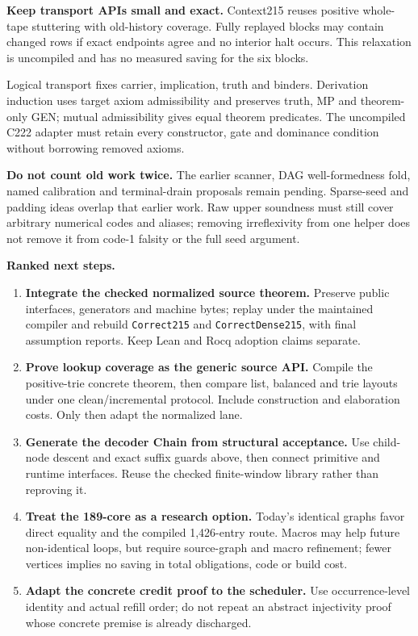 \documentclass[11pt]{article}
\newcommand{\code}[1]{\texttt{#1}}
\begin{document}
\textbf{Keep transport APIs small and exact.} Context215 reuses positive whole-tape stuttering with old-history coverage. Fully replayed blocks may contain changed rows if exact endpoints agree and no interior halt occurs. This relaxation is uncompiled and has no measured saving for the six blocks.

Logical transport fixes carrier, implication, truth and binders. Derivation induction uses target axiom admissibility and preserves truth, MP and theorem-only GEN; mutual admissibility gives equal theorem predicates. The uncompiled C222 adapter must retain every constructor, gate and dominance condition without borrowing removed axioms.

\textbf{Do not count old work twice.} The earlier scanner, DAG well-formedness fold, named calibration and terminal-drain proposals remain pending. Sparse-seed and padding ideas overlap that earlier work. Raw upper soundness must still cover arbitrary numerical codes and aliases; removing irreflexivity from one helper does not remove it from code-1 falsity or the full seed argument.

\textbf{Ranked next steps.}
\begin{enumerate}
\item \textbf{Integrate the checked normalized source theorem.} Preserve public interfaces, generators and machine bytes; replay under the maintained compiler and rebuild \code{Correct215} and \code{CorrectDense215}, with final assumption reports. Keep Lean and Rocq adoption claims separate.
\item \textbf{Prove lookup coverage as the generic source API.} Compile the positive-trie concrete theorem, then compare list, balanced and trie layouts under one clean/incremental protocol. Include construction and elaboration costs. Only then adapt the normalized lane.
\item \textbf{Generate the decoder Chain from structural acceptance.} Use child-node descent and exact suffix guards above, then connect primitive and runtime interfaces. Reuse the checked finite-window library rather than reproving it.
\item \textbf{Treat the 189-core as a research option.} Today's identical graphs favor direct equality and the compiled 1,426-entry route. Macros may help future non-identical loops, but require source-graph and macro refinement; fewer vertices implies no saving in total obligations, code or build cost.
\item \textbf{Adapt the concrete credit proof to the scheduler.} Use occurrence-level identity and actual refill order; do not repeat an abstract injectivity proof whose concrete premise is already discharged.
\end{enumerate}
\end{document}
